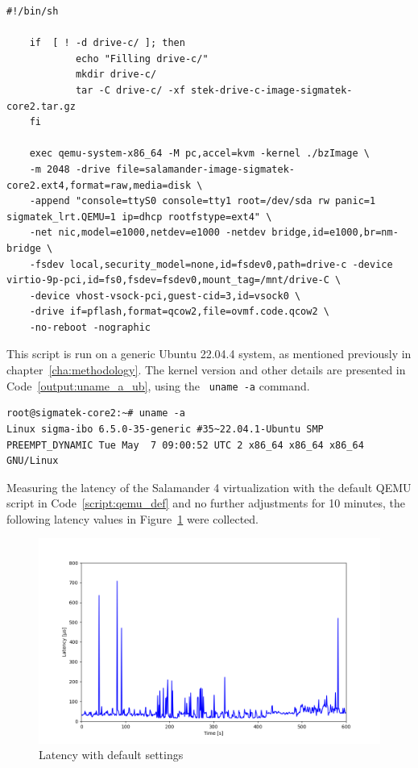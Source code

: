 \documentclass[MMR,Master,english]{twbook}
\begin{document}
\vspace{1em}
\begin{minipage}{\linewidth}
	\begin{lstlisting}[name={QEMU script for starting Salamander 4 virtualization},label={script:qemu_def}]
	#!/bin/sh

	if  [ ! -d drive-c/ ]; then
			echo "Filling drive-c/"
			mkdir drive-c/
			tar -C drive-c/ -xf stek-drive-c-image-sigmatek-core2.tar.gz
	fi
		
	exec qemu-system-x86_64 -M pc,accel=kvm -kernel ./bzImage \
	-m 2048 -drive file=salamander-image-sigmatek-core2.ext4,format=raw,media=disk \
	-append "console=ttyS0 console=tty1 root=/dev/sda rw panic=1 sigmatek_lrt.QEMU=1 ip=dhcp rootfstype=ext4" \
	-net nic,model=e1000,netdev=e1000 -netdev bridge,id=e1000,br=nm-bridge \
	-fsdev local,security_model=none,id=fsdev0,path=drive-c -device virtio-9p-pci,id=fs0,fsdev=fsdev0,mount_tag=/mnt/drive-C \
	-device vhost-vsock-pci,guest-cid=3,id=vsock0 \
	-drive if=pflash,format=qcow2,file=ovmf.code.qcow2 \
	-no-reboot -nographic
\end{lstlisting}
\end{minipage}

\noindent This script is run on a generic Ubuntu 22.04.4 system, as mentioned previously in chapter~\ref{cha:methodology}. The kernel version and other details are presented in Code~\ref{output:uname_a_ub}, using the ~\texttt{uname -a} command.

\vspace{1em}
\begin{minipage}{0.95\columnwidth}
	\begin{lstlisting}[name={Ubuntu 22.04.4 system information},label={output:uname_a_ub}]
root@sigmatek-core2:~# uname -a 
Linux sigma-ibo 6.5.0-35-generic #35~22.04.1-Ubuntu SMP PREEMPT_DYNAMIC Tue May  7 09:00:52 UTC 2 x86_64 x86_64 x86_64 GNU/Linux
\end{lstlisting}
\end{minipage}

\noindent Measuring the latency of the Salamander 4 virtualization with the default QEMU script in Code~\ref{script:qemu_def} and no further adjustments for 10 minutes, the following latency values in Figure~\ref{fig:max_latency_default} were collected. 

\begin{figure}[H]
	\centering
	\includegraphics[width=0.75\columnwidth]{img/max_latency_default.png}
	\caption[Latency with default settings]{Latency with default settings}
	\label{fig:max_latency_default}
\end{figure}
\end{document}
